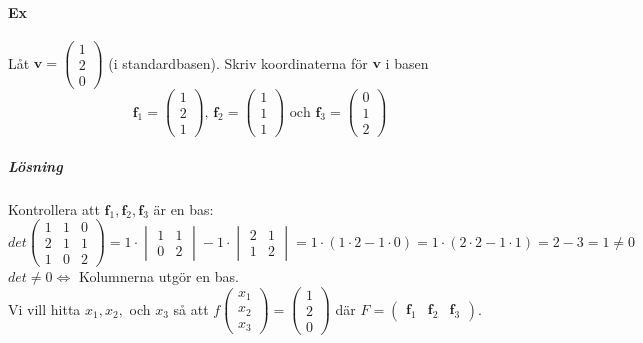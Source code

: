 \paragraph{Ex} Låt $\bm{v}=\begin{pmatrix}1\\2\\0\end{pmatrix}$ (i standardbasen).
Skriv koordinaterna för $\bm{v}$ i basen
\begin{equation*}
    \bm{f}_1=\begin{pmatrix}1\\2\\1\end{pmatrix}\text{, }
    \bm{f}_2=\begin{pmatrix}1\\1\\1\end{pmatrix}\text{ och }
    \bm{f}_3=\begin{pmatrix}0\\1\\2\end{pmatrix}
\end{equation*}
\subparagraph{Lösning} Kontrollera att $\bm{f}_1, \bm{f}_2, \bm{f}_3$ är en bas:
\begin{equation*}
    det\begin{pmatrix}1&1&0\\2&1&1\\1&0&2\end{pmatrix}=
    1\cdot\begin{vmatrix}1&1\\0&2\end{vmatrix}-1\cdot\begin{vmatrix}2&1\\1&2\end{vmatrix}=
    1\cdot (1\cdot 2-1\cdot 0)=1\cdot (2\cdot 2 - 1\cdot 1)=
    2-3=1\neq 0
\end{equation*}
$det\neq 0\Leftrightarrow$ Kolumnerna utgör en bas.\\
Vi vill hitta $x_1,x_2,$ och $x_3$ så att $f\begin{pmatrix}x_1\\x_2\\x_3\end{pmatrix}=\begin{pmatrix}1\\2\\0\end{pmatrix}$
där $F=\begin{pmatrix}\bm{f}_1&\bm{f}_2&\bm{f}_3\end{pmatrix}$.\\

